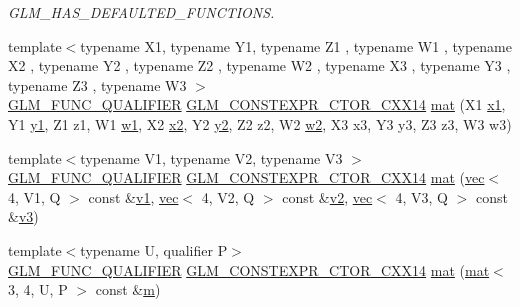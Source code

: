 \begin{DoxyCompactItemize}
\begin{DoxyCompactList}\small\item\em G\+L\+M\+\_\+\+H\+A\+S\+\_\+\+D\+E\+F\+A\+U\+L\+T\+E\+D\+\_\+\+F\+U\+N\+C\+T\+I\+O\+NS. \end{DoxyCompactList}\item 
{\footnotesize template$<$typename X1, typename Y1, typename Z1 , typename W1 , typename X2 , typename Y2 , typename Z2 , typename W2 , typename X3 , typename Y3 , typename Z3 , typename W3 $>$ }\\\mbox{\hyperlink{setup_8hpp_a33fdea6f91c5f834105f7415e2a64407}{G\+L\+M\+\_\+\+F\+U\+N\+C\+\_\+\+Q\+U\+A\+L\+I\+F\+I\+ER}} \mbox{\hyperlink{setup_8hpp_a0900f9145e68bf6061b6f5e7be3fa751}{G\+L\+M\+\_\+\+C\+O\+N\+S\+T\+E\+X\+P\+R\+\_\+\+C\+T\+O\+R\+\_\+\+C\+X\+X14}} \mbox{\hyperlink{structglm_1_1mat_3_013_00_014_00_01_t_00_01_q_01_4_ad1aebdb4ed006b9527f27253b13a54a7}{mat}} (X1 \mbox{\hyperlink{_s_d_l__opengl__glext_8h_a49825216c96caaeb09237b36651181c5}{x1}}, Y1 \mbox{\hyperlink{_s_d_l__opengl__glext_8h_a3af6c78fcdfccea028a5878bc747ef39}{y1}}, Z1 z1, W1 \mbox{\hyperlink{_s_d_l__opengl__glext_8h_ab5b747bf5adb1f9134337c30b9a4ce84}{w1}}, X2 \mbox{\hyperlink{_s_d_l__opengl__glext_8h_a7b907a03236685c534d89d604cff23c8}{x2}}, Y2 \mbox{\hyperlink{_s_d_l__opengl__glext_8h_a2be1135ed68e8d80fa9e130c7814f8c2}{y2}}, Z2 z2, W2 \mbox{\hyperlink{_s_d_l__opengl__glext_8h_a1ca5aca787be24213d9591fdf074b094}{w2}}, X3 x3, Y3 y3, Z3 z3, W3 w3)
\item 
{\footnotesize template$<$typename V1, typename V2, typename V3 $>$ }\\\mbox{\hyperlink{setup_8hpp_a33fdea6f91c5f834105f7415e2a64407}{G\+L\+M\+\_\+\+F\+U\+N\+C\+\_\+\+Q\+U\+A\+L\+I\+F\+I\+ER}} \mbox{\hyperlink{setup_8hpp_a0900f9145e68bf6061b6f5e7be3fa751}{G\+L\+M\+\_\+\+C\+O\+N\+S\+T\+E\+X\+P\+R\+\_\+\+C\+T\+O\+R\+\_\+\+C\+X\+X14}} \mbox{\hyperlink{structglm_1_1mat_3_013_00_014_00_01_t_00_01_q_01_4_ac2826bfed2065c9ecd22ac59bd41488b}{mat}} (\mbox{\hyperlink{structglm_1_1vec}{vec}}$<$ 4, V1, Q $>$ const \&\mbox{\hyperlink{_s_d_l__opengl__glext_8h_a435c176a02c061b43e19bdf7c86cceae}{v1}}, \mbox{\hyperlink{structglm_1_1vec}{vec}}$<$ 4, V2, Q $>$ const \&\mbox{\hyperlink{_s_d_l__opengl__glext_8h_a0928f6d0f0f794ba000a21dfae422136}{v2}}, \mbox{\hyperlink{structglm_1_1vec}{vec}}$<$ 4, V3, Q $>$ const \&\mbox{\hyperlink{_s_d_l__opengl__glext_8h_acc806b31cbf466ceba6555983d8b814d}{v3}})
\item 
{\footnotesize template$<$typename U, qualifier P$>$ }\\\mbox{\hyperlink{setup_8hpp_a33fdea6f91c5f834105f7415e2a64407}{G\+L\+M\+\_\+\+F\+U\+N\+C\+\_\+\+Q\+U\+A\+L\+I\+F\+I\+ER}} \mbox{\hyperlink{setup_8hpp_a0900f9145e68bf6061b6f5e7be3fa751}{G\+L\+M\+\_\+\+C\+O\+N\+S\+T\+E\+X\+P\+R\+\_\+\+C\+T\+O\+R\+\_\+\+C\+X\+X14}} \mbox{\hyperlink{structglm_1_1mat_3_013_00_014_00_01_t_00_01_q_01_4_a3cecec80a6625a5cccb51d98f04d96a4}{mat}} (\mbox{\hyperlink{structglm_1_1mat}{mat}}$<$ 3, 4, U, P $>$ const \&\mbox{\hyperlink{_s_d_l__opengl__glext_8h_af593500c283bf1a787a6f947f503a5c2}{m}})

\end{DoxyCompactItemize}
